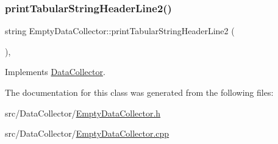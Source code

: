 \mbox{\label{classEmptyDataCollector_aa71282121251d344d674223409445be9_aa71282121251d344d674223409445be9}} 
\subsubsection{\texorpdfstring{print\+Tabular\+String\+Header\+Line2()}{printTabularStringHeaderLine2()}}
{\footnotesize\ttfamily string Empty\+Data\+Collector\+::print\+Tabular\+String\+Header\+Line2 (\begin{DoxyParamCaption}{ }\end{DoxyParamCaption})\hspace{0.3cm}{\ttfamily [override]}, {\ttfamily [virtual]}}



Implements \mbox{\hyperlink{classDataCollector_af01ea961314be2164f39e6d4cd59e443_af01ea961314be2164f39e6d4cd59e443}{Data\+Collector}}.



The documentation for this class was generated from the following files\+:\begin{DoxyCompactItemize}
\item 
src/\+Data\+Collector/\mbox{\hyperlink{EmptyDataCollector_8h}{Empty\+Data\+Collector.\+h}}\item 
src/\+Data\+Collector/\mbox{\hyperlink{EmptyDataCollector_8cpp}{Empty\+Data\+Collector.\+cpp}}\end{DoxyCompactItemize}
